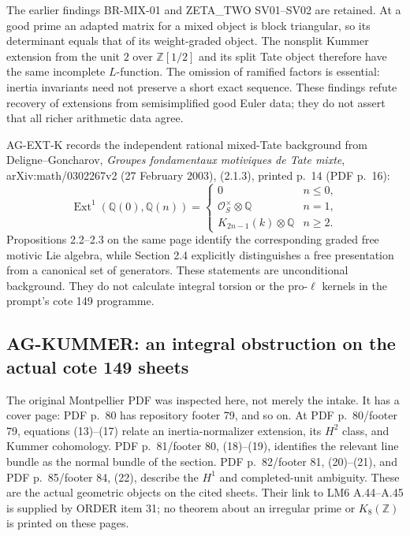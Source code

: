 The earlier findings BR-MIX-01 and ZETA\_TWO SV01--SV02 are retained.
At a good prime an adapted matrix for a mixed object is block triangular,
so its determinant equals that of its weight-graded object. The nonsplit
Kummer extension from the unit $2$ over $\mathbb Z[1/2]$ and its split
Tate object therefore have the same incomplete $L$-function. The omission
of ramified factors is essential: inertia invariants need not preserve a
short exact sequence. These findings refute recovery of extensions from
semisimplified good Euler data; they do not assert that all richer
arithmetic data agree.

AG-EXT-K records the independent rational mixed-Tate background from Deligne--Goncharov,
\emph{Groupes fondamentaux motiviques de Tate mixte},
arXiv:math/0302267v2 (27 February 2003), (2.1.3), printed p.~14
(PDF p.~16):
\[
 \operatorname{Ext}^1(\mathbb Q(0),\mathbb Q(n))=
 \begin{cases}
 0&n\le0,\\
 \mathcal O_S^\times\otimes\mathbb Q&n=1,\\
 K_{2n-1}(k)\otimes\mathbb Q&n\ge2.
 \end{cases}
\]
Propositions 2.2--2.3 on the same page identify the corresponding graded
free motivic Lie algebra, while Section 2.4 explicitly distinguishes a
free presentation from a canonical set of generators. These statements
are unconditional background. They do not calculate integral torsion or
the pro-$\ell$ kernels in the prompt's cote 149 programme.

\subsection{AG-KUMMER: an integral obstruction on the actual cote 149 sheets}
\label{ag:kummer}

The original Montpellier PDF was inspected here, not merely the intake.
It has a cover page: PDF p.~80 has repository footer 79, and so on.
At PDF p.~80/footer 79, equations (13)--(17) relate an inertia-normalizer
extension, its $H^2$ class, and Kummer cohomology. PDF p.~81/footer 80,
(18)--(19), identifies the relevant line bundle as the normal bundle of
the section. PDF p.~82/footer 81, (20)--(21), and PDF p.~85/footer 84,
(22), describe the $H^1$ and completed-unit ambiguity. These are the
actual geometric objects on the cited sheets. Their link to LM6
A.44--A.45 is supplied by ORDER item 31; no theorem about an irregular
prime or $K_8(\mathbb Z)$ is printed on these pages.

